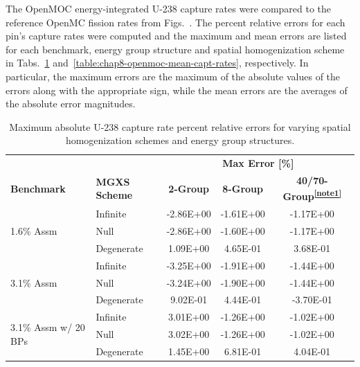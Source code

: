 The OpenMOC energy-integrated U-238 capture rates were compared to the reference OpenMC fission rates from Figs.~. The percent relative errors for each pin's capture rates were computed and the maximum and mean errors are listed for each benchmark, energy group structure and spatial homogenization scheme in Tabs.~\ref{table:chap8-openmoc-max-capt-rates} and~\ref{table:chap8-openmoc-mean-capt-rates}, respectively. In particular, the maximum errors are the maximum of the absolute values of the errors along with the appropriate sign, while the mean errors are the averages of the absolute error magnitudes.

\begin{table}[h!]
  \centering
  \caption[Maximum OpenMOC U-238 capture rate errors]{Maximum absolute U-238 capture rate percent relative errors for varying spatial homogenization schemes and energy group structures.}
  \small
  \label{table:chap8-openmoc-max-capt-rates}
  \vspace{6pt}
  \begin{tabular}{l l c c c}
  \toprule
  \rowcolor{lightgray}
  & & \multicolumn{3}{c}{\cellcolor{lightgray} \textbf{Max Error [\%]}} \\
  \multirow{-2}{*}{\cellcolor{lightgray} \bf Benchmark} &
  \multirow{-2}{*}{\cellcolor{lightgray} \bf \ac{MGXS} Scheme} &
  \multicolumn{1}{c}{{\cellcolor{lightgray} \bf 2-Group}} &
  \multicolumn{1}{c}{{\cellcolor{lightgray} \bf 8-Group}} &
  \multicolumn{1}{c}{{\cellcolor{lightgray} \bf 40/70-Group\textsuperscript{\ref{note1}}}} \\
  \midrule
\multirow{3}{*}{\parbox{2.5cm}{1.6\% Assm}} & Infinite & -2.86E+00 & -1.61E+00 & -1.17E+00 \\
& Null & -2.86E+00 & -1.60E+00 & -1.17E+00 \\
& Degenerate & 1.09E+00 & 4.65E-01 & 3.68E-01 \\
  \midrule
\multirow{3}{*}{\parbox{2.5cm}{3.1\% Assm}} & Infinite & -3.25E+00 & -1.91E+00 & -1.44E+00 \\
& Null & -3.24E+00 & -1.90E+00 & -1.44E+00 \\
& Degenerate & 9.02E-01 & 4.44E-01 & -3.70E-01 \\
  \midrule
\multirow{3}{*}{\parbox{2.5cm}{3.1\% Assm w/ 20 BPs}} & Infinite & 3.01E+00 & -1.26E+00 & -1.02E+00 \\
& Null & 3.02E+00 & -1.26E+00 & -1.02E+00 \\
& Degenerate & 1.45E+00 & 6.81E-01 & 4.04E-01 \\

\end{tabular}
\end{table}
